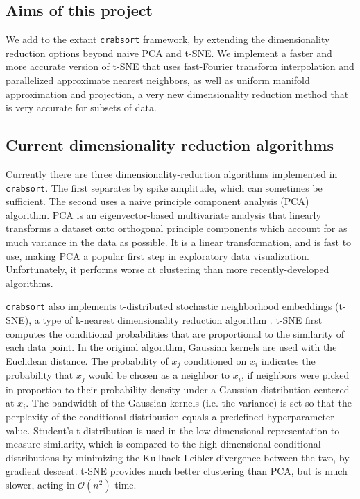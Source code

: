 \documentclass{article}
\begin{document}
\subsection{Aims of this project}

We add to the extant \texttt{crabsort} framework,
by extending the dimensionality reduction options beyond naive PCA and t-SNE.
We implement a faster and more accurate version of t-SNE that uses fast-Fourier transform interpolation and parallelized approximate nearest neighbors,
as well as uniform manifold approximation and projection, a very new dimensionality reduction method that is very accurate for subsets of data.

\subsection{Current dimensionality reduction algorithms}

Currently there are three dimensionality-reduction algorithms implemented in \texttt{crabsort}.
The first separates by spike amplitude, which can sometimes be sufficient.
The second uses a naive principle component analysis (PCA) algorithm.
PCA is an eigenvector-based multivariate analysis that linearly transforms a dataset onto
orthogonal principle components which account for as much variance in the data as possible.
It is a linear transformation, and is fast to use, making PCA a popular first step in exploratory data visualization.
Unfortunately, it performs worse at clustering than more recently-developed algorithms.

\texttt{crabsort} also implements t-distributed stochastic neighborhood embeddings (t-SNE),
a type of k-nearest dimensionality reduction algorithm \autocite{vandermaatenAcceleratingTSNEUsing2014}.
t-SNE first computes the conditional probabilities that are proportional to the similarity of each data point.
In the original algorithm, Gaussian kernels are used with the Euclidean distance.
The probability of $x_j$ conditioned on $x_i$ indicates the probability
that $x_j$ would be chosen as a neighbor to $x_i$,
if neighbors were picked in proportion to their probability density under a Gaussian distribution centered at $x_i$.
The bandwidth of the Gaussian kernels (i.e. the variance) is set so that
the perplexity of the conditional distribution equals a predefined hyperparameter value.
Student's t-distribution is used in the low-dimensional representation to measure similarity,
which is compared to the high-dimensional conditional distributions
by minimizing the Kullback-Leibler divergence between the two, by gradient descent.
t-SNE provides much better clustering than PCA, but is much slower, acting in $\mathcal{O}(n^2)$ time.
\end{document}

